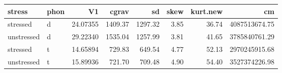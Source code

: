 \begin{table}[ht]
\centering
\begin{tabular}{llrrrrrr}
  \hline
stress     & phon & V1       & cgrav   & sd      & skew & kurt.new & cm \\
  \hline
stressed   & d    & 24.07355 & 1409.37 & 1297.32 & 3.85 & 36.74    & 4087513674.75 \\
unstressed & d    & 29.22340 & 1535.04 & 1257.99 & 3.81 & 41.65    & 3785840761.29 \\
stressed   & t    & 14.65894 & 729.83  & 649.54  & 4.77 & 52.13    & 2970245915.68 \\
unstressed & t    & 15.89936 & 721.70  & 709.48  & 4.90 & 54.40    & 3527374226.98 \\
   \hline
\end{tabular}
\end{table}
